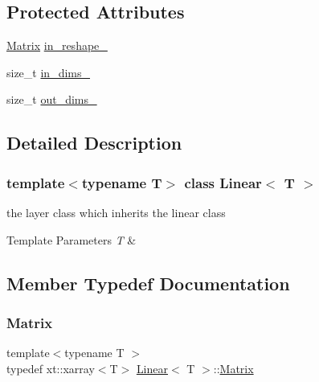 \subsection*{Protected Attributes}
\begin{DoxyCompactItemize}
\item 
\mbox{\hyperlink{class_layer_a22b1e7286096aa62bd245536c8ebdaf1}{Matrix}} \mbox{\hyperlink{class_linear_a52fbc58c45b62d75089fc627c5210455}{in\+\_\+reshape\+\_\+}}
\item 
size\+\_\+t \mbox{\hyperlink{class_linear_ae15dad7b24bbc705da10f6896188ab13}{in\+\_\+dims\+\_\+}}
\item 
size\+\_\+t \mbox{\hyperlink{class_linear_affb0e56f0ca748a62e4aa5ce5733b491}{out\+\_\+dims\+\_\+}}
\end{DoxyCompactItemize}


\subsection{Detailed Description}
\subsubsection*{template$<$typename T$>$\newline
class Linear$<$ T $>$}

the layer class which inherits the linear class 


\begin{DoxyTemplParams}{Template Parameters}
{\em T} & \\
\hline
\end{DoxyTemplParams}


\subsection{Member Typedef Documentation}
\mbox{\label{class_linear_a8e402d70272bdb6406745f7ec4139f16}} 
\subsubsection{\texorpdfstring{Matrix}{Matrix}}
{\footnotesize\ttfamily template$<$typename T $>$ \\
typedef xt\+::xarray$<$T$>$ \mbox{\hyperlink{class_linear}{Linear}}$<$ T $>$\+::\mbox{\hyperlink{class_layer_a22b1e7286096aa62bd245536c8ebdaf1}{Matrix}}}

